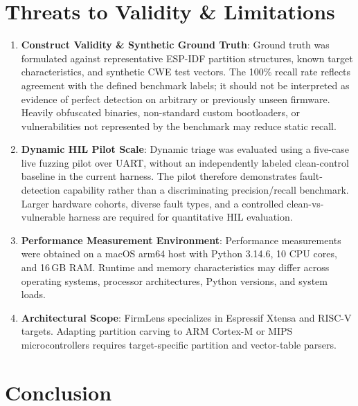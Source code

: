 \documentclass[conference]{IEEEtran}
\begin{document}
\section{Threats to Validity \& Limitations}
\label{sec:threats}

\begin{enumerate}

    \item \textbf{Construct Validity \& Synthetic Ground Truth}: Ground truth was formulated against representative ESP-IDF partition structures, known target characteristics, and synthetic CWE test vectors. The 100\% recall rate reflects agreement with the defined benchmark labels; it should not be interpreted as evidence of perfect detection on arbitrary or previously unseen firmware. Heavily obfuscated binaries, non-standard custom bootloaders, or vulnerabilities not represented by the benchmark may reduce static recall.

    \item \textbf{Dynamic HIL Pilot Scale}: Dynamic triage was evaluated using a five-case live fuzzing pilot over UART, without an independently labeled clean-control baseline in the current harness. The pilot therefore demonstrates fault-detection capability rather than a discriminating precision/recall benchmark. Larger hardware cohorts, diverse fault types, and a controlled clean-vs-vulnerable harness are required for quantitative HIL evaluation.
    
    \item \textbf{Performance Measurement Environment}: Performance measurements were obtained on a macOS arm64 host with Python 3.14.6, 10 CPU cores, and 16\,GB RAM. Runtime and memory characteristics may differ across operating systems, processor architectures, Python versions, and system loads.

    \item \textbf{Architectural Scope}: FirmLens specializes in Espressif Xtensa and RISC-V targets. Adapting partition carving to ARM Cortex-M or MIPS microcontrollers requires target-specific partition and vector-table parsers.

\end{enumerate}

\section{Conclusion}
\end{document}
